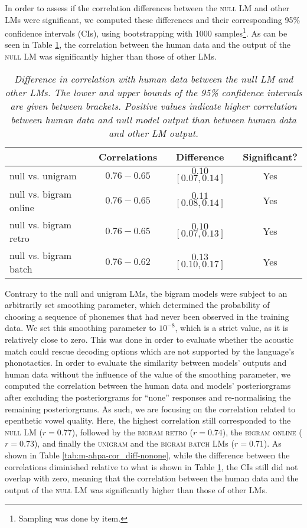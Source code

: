 {In order to assess if the correlation differences between the \textsc{null} LM and other LMs were significant, we computed these differences and their corresponding 95\% confidence intervals (CIs), using bootstrapping with 1000 samples\footnote{Sampling was done by item.}. As can be seen in Table \ref{tab:m-ahpa-cor_diff}, the correlation between the human data and the output of the \textsc{null} LM was significantly higher than those of other LMs.

\begin{table}[htb!]
\centering
\caption{\textit{Difference in correlation with human data between the null LM and other LMs. The lower and upper bounds of the 95\% confidence intervals are given between brackets. Positive values indicate higher correlation between human data and null model output than between human data and other LM output.}}
  \label{tab:m-ahpa-cor_diff}
\vspace{0.25cm}
\begin{tabular}{lccc}
  \toprule
 & Correlations & Difference & Significant? \\  \midrule
null vs. unigram & $0.76 - 0.65$ & $0.10$ $[0.07, 0.14]$ & Yes \\ 
  null vs. bigram online & $0.76 - 0.65$ & $0.11$ $[0.08, 0.14]$ & Yes \\ 
  null vs. bigram retro & $0.76 - 0.65$ & $0.10$ $[0.07, 0.13]$ & Yes \\ 
  null vs. bigram batch & $0.76 - 0.62$ & $0.13$ $[0.10, 0.17]$ & Yes \\ \bottomrule 
\end{tabular}
\end{table}

Contrary to the null and unigram LMs, the bigram models were subject to an arbitrarily set smoothing parameter, which determined the probability of choosing a sequence of phonemes that had never been observed in the training data. We set this smoothing parameter to $10^{-8}$, which is a strict value, as it is relatively close to zero. This was done in order to evaluate whether the acoustic match could rescue decoding options which are not supported by the language's phonotactics. In order to evaluate the similarity between models' outputs and human data without the influence of the value of the smoothing parameter, we computed the correlation between the human data and models' posteriorgrams after excluding the posteriorgrams for ``none'' responses and re-normalising the remaining posteriorgrams. As such, we are focusing on the correlation related to epenthetic vowel quality.
Here, the highest correlation still corresponded to the \textsc{null} LM ($r = 0.77$), followed by the \textsc{bigram retro} ($r = 0.74$), the \textsc{bigram online} ($r = 0.73$), and finally the \textsc{unigram} and the \textsc{bigram batch} LMs ($r = 0.71$). 
As shown in Table \ref{tab:m-ahpa-cor_diff-nonone}, while the difference between the correlations diminished relative to what is shown in Table \ref{tab:m-ahpa-cor_diff}, the CIs still did not overlap with zero, meaning that the correlation between the human data and the output of the \textsc{null} LM was significantly higher than those of other LMs.  

}
